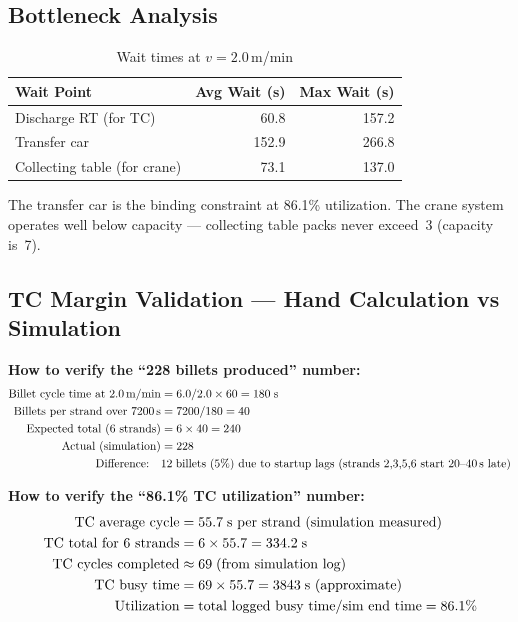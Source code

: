 \documentclass[11pt,a4paper]{article}
\begin{document}
\subsection{Bottleneck Analysis}

\begin{table}[H]
\centering
\caption{Wait times at $v = 2.0$\,m/min}
\label{tab:waits-2.0}
\begin{tabular}{@{}lrr@{}}
\toprule
Wait Point & Avg Wait (s) & Max Wait (s) \\
\midrule
Discharge RT (for TC) & 60.8 & 157.2 \\
Transfer car & 152.9 & 266.8 \\
Collecting table (for crane) & 73.1 & 137.0 \\
\bottomrule
\end{tabular}
\end{table}

The transfer car is the binding constraint at 86.1\% utilization. The crane system operates well below capacity --- collecting table packs never exceed~3 (capacity is~7).

\subsection{TC Margin Validation --- Hand Calculation vs Simulation}

\textbf{How to verify the ``228 billets produced'' number:}
\begin{align}
\text{Billet cycle time at 2.0\,m/min} &= 6.0 / 2.0 \times 60 = 180\;\text{s} \notag\\
\text{Billets per strand over 7200\,s} &= 7200 / 180 = 40 \notag\\
\text{Expected total (6 strands)} &= 6 \times 40 = 240 \notag\\
\text{Actual (simulation)} &= 228 \notag\\
\text{Difference:}\quad & 12\;\text{billets (5\%) due to startup lags (strands 2,3,5,6 start 20--40\,s late)} \notag
\end{align}

\textbf{How to verify the ``86.1\% TC utilization'' number:}
\begin{align}
\text{TC average cycle} &= 55.7\;\text{s per strand (simulation measured)} \notag\\
\text{TC total for 6 strands} &= 6 \times 55.7 = 334.2\;\text{s} \notag\\
\text{TC cycles completed} &\approx 69\;\text{(from simulation log)} \notag\\
\text{TC busy time} &= 69 \times 55.7 = 3843\;\text{s (approximate)} \notag\\
\text{Utilization} &= \text{total logged busy time} / \text{sim end time} = 86.1\% \notag
\end{align}
\end{document}
